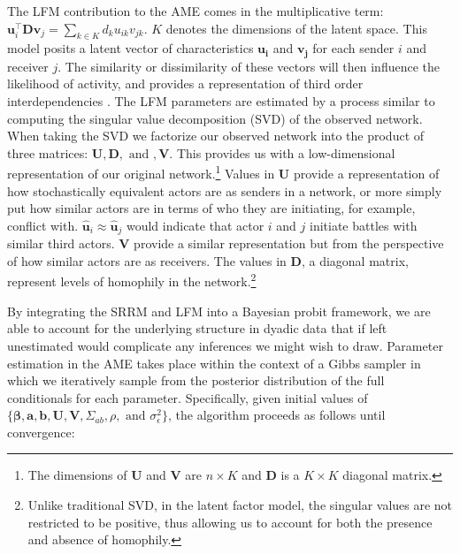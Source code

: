 The LFM contribution to the AME comes in the multiplicative term: $\textbf{u}_{i}^{\top} \textbf{D} \textbf{v}_{j}=\sum_{k \in K} d_{k} u_{ik} v_{jk}$. $K$ denotes the dimensions of the latent space. This model posits a latent vector of characteristics $\mathbf{u_{i}}$ and $\mathbf{v_{j}}$ for each sender $i$ and receiver $j$. The similarity or dissimilarity of these vectors will then influence the likelihood of activity, and provides a representation of third order interdependencies \citep{minhas:etal:2016:arxiv}. The LFM parameters are estimated by a process similar to computing the singular value decomposition (SVD) of the observed network. When taking the SVD we factorize our observed network into the product of three matrices: $\textbf{U}, \textbf{D}, \text{ and }, \textbf{V}$. This provides us with a low-dimensional representation of our original network.\footnote{The dimensions of $\textbf{U}$ and $\textbf{V}$ are $n \times K$ and $\textbf{D}$ is a $K \times K$ diagonal matrix.} Values in $\textbf{U}$ provide a representation of how stochastically equivalent actors are as senders in a network, or more simply put how similar actors are in terms of who they are initiating, for example, conflict with. $\hat{\textbf{u}}_{i} \approx \hat{\textbf{u}}_{j}$ would indicate that actor $i$ and $j$ initiate battles with similar third actors. $\textbf{V}$ provide a similar representation but from the perspective of how similar actors are as receivers. The values in $\textbf{D}$, a diagonal matrix, represent levels of homophily in the network.\footnote{Unlike traditional SVD, in the latent factor model, the singular values are not restricted to be positive, thus allowing us to account for both the presence and absence of homophily.} 

By integrating the SRRM and LFM into a Bayesian probit framework, we are able to account for the underlying structure in dyadic data that if left unestimated would complicate any inferences we might wish to draw. Parameter estimation in the AME takes place within the context of a Gibbs sampler in which we iteratively sample from the posterior distribution of the full conditionals for each parameter. Specifically, given initial values of $\{\bm\beta, \textbf{a}, \textbf{b}, \textbf{U}, \textbf{V}, \Sigma_{ab}, \rho, \text{ and } \sigma_{\epsilon}^{2}\}$, the algorithm proceeds as follows until convergence:

